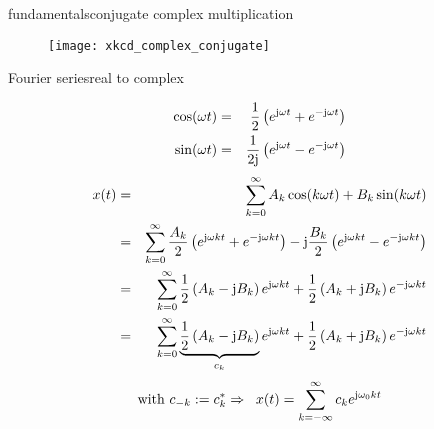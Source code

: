         \begin{frame}{fundamentals}{conjugate complex multiplication}
            \begin{figure}
                \texttt{[image: xkcd\_complex\_conjugate]}
            \end{figure}
            
        \end{frame}

        \begin{frame}{Fourier series}{real to complex}
            \vspace{-5mm}
            \begin{footnotesize}
            \begin{eqnarray*}
                \cos(\omega t) &=& \frac{1}{2}\left(e^{\mathrm{j}\omega t} + e^{-\mathrm{j}\omega t}\right)\nonumber\\
                \sin(\omega t) &=& \frac{1}{2\mathrm{j}}\left(e^{\mathrm{j}\omega t} - e^{-\mathrm{j}\omega t}\right)\nonumber
            \end{eqnarray*}
            \pause
            \vspace{-2mm}
            \begin{eqnarray*}
                x(t) &=& \sum\limits_{k=0}^{\infty} A_k\cos(k\omega t) + B_k\sin(k\omega t)\nonumber\\
                &=& \sum\limits_{k=0}^{\infty} \frac{A_k}{2}\left(e^{\mathrm{j}\omega kt} + e^{-\mathrm{j}\omega kt}\right) - \mathrm{j}\frac{B_k}{2}\left(e^{\mathrm{j}\omega kt} - e^{-\mathrm{j}\omega kt}\right)\nonumber\\
                &=& \sum\limits_{k=0}^{\infty} \frac{1}{2}\left(A_k-\mathrm{j}B_k\right)e^{\mathrm{j}\omega kt} +  \frac{1}{2}\left(A_k+\mathrm{j}B_k\right)e^{-\mathrm{j}\omega kt}\nonumber\\
                &=& \sum\limits_{k=0}^{\infty} \underbrace{\frac{1}{2}\left(A_k-\mathrm{j}B_k\right)}_{c_k}e^{\mathrm{j}\omega kt} +  \frac{1}{2}\left(A_k+\mathrm{j}B_k\right)e^{-\mathrm{j}\omega kt}\nonumber
            \end{eqnarray*}
            \begin{equation*}\nonumber
               \text{with } c_{-k} := c^\ast_k \Rightarrow\;\; x(t) = \sum\limits_{k=-\infty}^{\infty} c_k e^{\mathrm{j}\omega_0kt}
            \end{equation*}
            \end{footnotesize}
        \end{frame}


